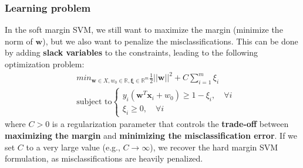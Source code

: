 \subsubsection{Learning problem}
In the soft margin SVM, we still want to maximize the margin (minimize the norm of $\boldsymbol{w}$), but we also want to penalize the misclassifications.
This can be done by adding \textbf{slack variables} to the constraints, leading to the following optimization problem:
\begin{equation} \label{eq:soft_svm_opt}
    \begin{aligned}
        & min_{\boldsymbol{w} \in X, w_0 \in \mathbb{R}, \boldsymbol{\xi} \in \mathbb{R}^m} \frac{1}{2}||\boldsymbol{w}||^2 + C \sum_{i=1}^{m} \xi_i \\
        & \text{subject to} \begin{cases}
            y_i (\boldsymbol{w}^T \boldsymbol{x}_i + w_0) \geq 1 - \xi_i, \quad \forall i \\
            \xi_i \geq 0, \quad \forall i
        \end{cases}
    \end{aligned}
\end{equation}
where $C > 0$ is a regularization parameter that controls the \textbf{trade-off} between 
\textbf{maximizing the margin} and \textbf{minimizing the misclassification error}.
If we set $C$ to a very large value (e.g., $C \to \infty$), we recover the hard margin SVM formulation, 
as misclassifications are heavily penalized.

